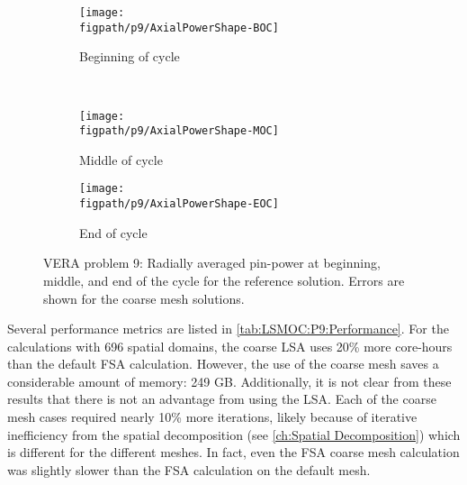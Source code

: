 {{{      \begin{figure}[h]
        \centering
        \begin{subfigure}[t]{0.49\textwidth}
          \centering
          \texttt{[image: \\figpath/p9/AxialPowerShape-BOC]}
          \caption{Beginning of cycle\label{fig:LSMOC:P9:AxialPowerShape:BOC}}
        \end{subfigure}%
        ~
        \begin{subfigure}[t]{0.49\textwidth}
          \centering
          \texttt{[image: \\figpath/p9/AxialPowerShape-MOC]}
          \caption{Middle of cycle\label{fig:LSMOC:P9:AxialPowerShape:MOC}}
        \end{subfigure}
        \begin{subfigure}[t]{0.49\textwidth}
          \centering
          \texttt{[image: \\figpath/p9/AxialPowerShape-EOC]}
          \caption{End of cycle\label{fig:LSMOC:P9:AxialPowerShape:EOC}}
        \end{subfigure}%
        \caption{
          VERA problem 9: Radially averaged pin-power at beginning, middle, and end of the cycle for the reference solution.
          Errors are shown for the coarse mesh solutions.
          \label{figs:LSMOC:P9:AxialPowerShape}
          }
      \end{figure}

      Several performance metrics are listed in \cref{tab:LSMOC:P9:Performance}.
      For the calculations with 696 spatial domains, the coarse \ac{LSA} uses 20\% more core-hours than the default \ac{FSA} calculation.
      However, the use of the coarse mesh saves a considerable amount of memory: 249 GB.
      Additionally, it is not clear from these results that there is not an advantage from using the \ac{LSA}.
      Each of the coarse mesh cases required nearly 10\% more iterations, likely because of iterative inefficiency from the spatial decomposition (see \cref{ch:Spatial Decomposition}) which is different for the different meshes.
      In fact, even the \ac{FSA} coarse mesh calculation was slightly slower than the \ac{FSA} calculation on the default mesh.

}}}
